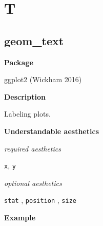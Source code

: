 \documentclass[
  letterpaper,
  DIV=11,
  numbers=noendperiod]{scrreprt}
\begin{document}

\chapter{T}\label{sec-t}

\section{geom\_text}\label{text}

\textbf{Package}

ggplot2 (Wickham 2016)

\textbf{Description}

Labeling plots.

\textbf{Understandable aesthetics}

\emph{required aesthetics}

\texttt{x}, \texttt{y}

\emph{optional aesthetics}

\texttt{stat} , \texttt{position} , \texttt{size}

\textbf{Example}
\end{document}
